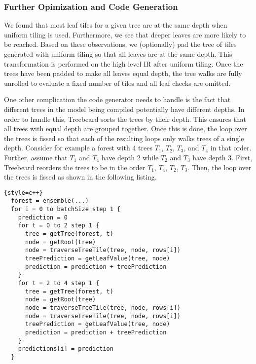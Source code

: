 \subsubsection{Further Opimization and Code Generation}
We found that most leaf tiles for a given tree are at the same depth when uniform tiling is used. Furthermore, we see that deeper leaves 
are more likely to be reached.
Based on these observations, we (optionally) pad the tree of tiles generated with uniform tiling so that all leaves are at the same depth.
This transformation is performed on the high level IR after uniform tiling. 
Once the trees have been padded to make all leaves equal depth, the tree walks are fully unrolled to evaluate a fixed 
number of tiles and all leaf checks are omitted.

One other complication the code generator needs to handle is the fact that different trees in the model being 
compiled potentially have different depths. In order to handle
this, Treebeard sorts the trees by their depth. This ensures that all trees with equal depth are grouped together. Once this is done, 
the loop over the trees is fissed so that each of the resulting loops only walks trees of a single depth. Consider for example a 
forest with 4 trees $T_1$, $T_2$, $T_3$, and $T_4$ in that order. Further, assume that $T_1$ and $T_4$ have depth 2 while $T_2$ and $T_3$
have depth 3. First, Treebeard reorders the trees to be in the order $T_1$, $T_4$, $T_2$, $T_3$. Then, the loop over the trees is fissed
as shown in the following listing.

\begin{lstlisting}{style=c++}
  forest = ensemble(...)
  for i = 0 to batchSize step 1 {
    prediction = 0
    for t = 0 to 2 step 1 {
      tree = getTree(forest, t) 
      node = getRoot(tree)
      node = traverseTreeTile(tree, node, rows[i])
      treePrediction = getLeafValue(tree, node)
      prediction = prediction + treePrediction
    }
    for t = 2 to 4 step 1 {
      tree = getTree(forest, t) 
      node = getRoot(tree)
      node = traverseTreeTile(tree, node, rows[i])
      node = traverseTreeTile(tree, node, rows[i])
      treePrediction = getLeafValue(tree, node)
      prediction = prediction + treePrediction
    }
    predictions[i] = prediction
  }  
\end{lstlisting}

